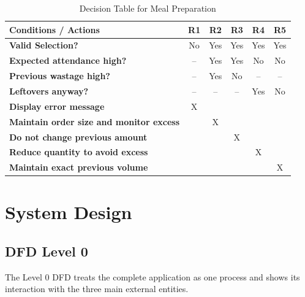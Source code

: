 \documentclass[12pt,a4paper]{report}
\begin{document}
\begin{table}[H]
	\centering
	\caption{Decision Table for Meal Preparation}
	\renewcommand{\arraystretch}{1.3}
	\small
	\begin{tabularx}{\textwidth}{|X|c|c|c|c|c|}
		\hline
		\textbf{Conditions / Actions}
		& \textbf{R1}
		& \textbf{R2}
		& \textbf{R3}
		& \textbf{R4}
		& \textbf{R5} \\
		\hline
		
		\textbf{Valid Selection?}
		& No & Yes & Yes & Yes & Yes \\
		\hline
		
		\textbf{Expected attendance high?}
		& -- & Yes & Yes & No & No \\
		\hline
		
		\textbf{Previous wastage high?}
		& -- & Yes & No & -- & -- \\
		\hline
		
		\textbf{Leftovers anyway?}
		& -- & -- & -- & Yes & No \\
		\hline
		
		\textbf{Display error message}
		& X & & & & \\
		\hline
		
		\textbf{Maintain order size and monitor excess}
		& & X & & & \\
		\hline
		
		\textbf{Do not change previous amount}
		& & & X & & \\
		\hline
		
		\textbf{Reduce quantity to avoid excess}
		& & & & X & \\
		\hline
		
		\textbf{Maintain exact previous volume}
		& & & & & X \\
		\hline
	\end{tabularx}
\end{table}
	
	
	\chapter{System Design}
	
	\section{DFD Level 0}
	
	The Level 0 DFD treats the complete application as one process and shows its interaction with the three main external entities.
	
\end{document}

